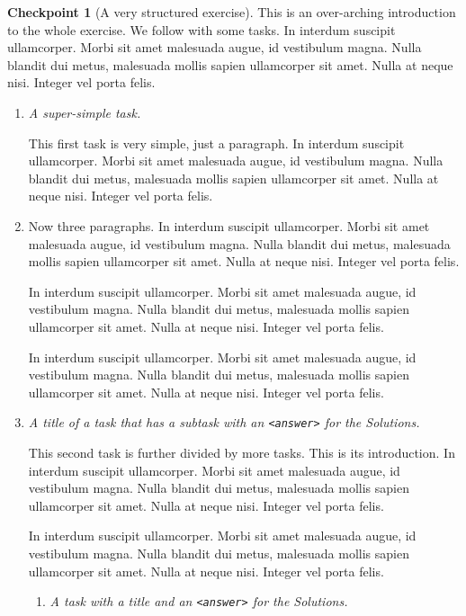 \documentclass{amsart}
\theoremstyle{plain}%
\theoremstyle{definition}%
\newtheorem{inlineexercise}[theorem]{Checkpoint}
\theoremstyle{remark}%
\newcommand{\mono}[1]{\texttt{#1}}
\newcommand{\lititle}[1]{{\slshape#1}}
\numberwithin{equation}{section}
\begin{document}
\begin{inlineexercise}[A very structured exercise]\label{exercise-structured}%
%
This is an over-arching introduction to the whole exercise.  We follow with some tasks.  In interdum suscipit ullamcorper. Morbi sit amet malesuada augue, id vestibulum magna. Nulla blandit dui metus, malesuada mollis sapien ullamcorper sit amet. Nulla at neque nisi. Integer vel porta felis.%
\begin{enumerate}[font=\bfseries,label=(\alph*),ref=\alph*]%
\item{}\lititle{A super-simple task.}\par%
This first task is very simple, just a paragraph.  In interdum suscipit ullamcorper. Morbi sit amet malesuada augue, id vestibulum magna. Nulla blandit dui metus, malesuada mollis sapien ullamcorper sit amet. Nulla at neque nisi. Integer vel porta felis.%
\item{}Now three paragraphs.  In interdum suscipit ullamcorper. Morbi sit amet malesuada augue, id vestibulum magna. Nulla blandit dui metus, malesuada mollis sapien ullamcorper sit amet. Nulla at neque nisi. Integer vel porta felis.%
\par
In interdum suscipit ullamcorper. Morbi sit amet malesuada augue, id vestibulum magna. Nulla blandit dui metus, malesuada mollis sapien ullamcorper sit amet. Nulla at neque nisi. Integer vel porta felis.%
\par
In interdum suscipit ullamcorper. Morbi sit amet malesuada augue, id vestibulum magna. Nulla blandit dui metus, malesuada mollis sapien ullamcorper sit amet. Nulla at neque nisi. Integer vel porta felis.%
\item{}\lititle{A title of a task that has a subtask with an \mono{<answer>} for the Solutions.}\par%
This second task is further divided by more tasks.  This is its introduction.  In interdum suscipit ullamcorper. Morbi sit amet malesuada augue, id vestibulum magna. Nulla blandit dui metus, malesuada mollis sapien ullamcorper sit amet. Nulla at neque nisi. Integer vel porta felis.%
\par
In interdum suscipit ullamcorper. Morbi sit amet malesuada augue, id vestibulum magna. Nulla blandit dui metus, malesuada mollis sapien ullamcorper sit amet. Nulla at neque nisi. Integer vel porta felis.%
\begin{enumerate}[font=\bfseries,label=(\roman*),ref=\theenumi.\roman*]%
\item{}\lititle{A task with a title and an \mono{<answer>} for the Solutions.}\par%

\end{enumerate}
\end{enumerate}
\end{inlineexercise}
\end{document}
